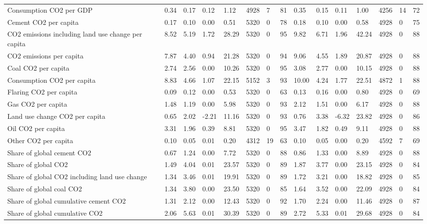 \begin{longtable}{lllllllllllllll}
\addlinespace
Consumption CO2 per GDP & 0.34 & 0.17 & 0.12 & 1.12 & 4928 & 7 & 81 & 0.35 & 0.15 & 0.11 & 1.00 & 4256 & 14 & 72\\
Cement CO2 per capita & 0.17 & 0.10 & 0.00 & 0.51 & 5320 & 0 & 78 & 0.18 & 0.10 & 0.00 & 0.58 & 4928 & 0 & 75\\
CO2 emissions including land use change per capita & 8.52 & 5.19 & 1.72 & 28.29 & 5320 & 0 & 95 & 9.82 & 6.71 & 1.96 & 42.24 & 4928 & 0 & 88\\
CO2 emissions per capita & 7.87 & 4.40 & 0.94 & 21.28 & 5320 & 0 & 94 & 9.06 & 4.55 & 1.89 & 20.87 & 4928 & 0 & 88\\
Coal CO2 per capita & 2.74 & 2.56 & 0.00 & 10.26 & 5320 & 0 & 95 & 3.08 & 2.77 & 0.00 & 10.15 & 4928 & 0 & 88\\
\addlinespace
Consumption CO2 per capita & 8.83 & 4.66 & 1.07 & 22.15 & 5152 & 3 & 93 & 10.00 & 4.24 & 1.77 & 22.51 & 4872 & 1 & 88\\
Flaring CO2 per capita & 0.09 & 0.12 & 0.00 & 0.53 & 5320 & 0 & 63 & 0.13 & 0.16 & 0.00 & 0.80 & 4928 & 0 & 69\\
Gas CO2 per capita & 1.48 & 1.19 & 0.00 & 5.98 & 5320 & 0 & 93 & 2.12 & 1.51 & 0.00 & 6.17 & 4928 & 0 & 88\\
Land use change CO2 per capita & 0.65 & 2.02 & -2.21 & 11.16 & 5320 & 0 & 93 & 0.76 & 3.38 & -6.32 & 23.82 & 4928 & 0 & 86\\
Oil CO2 per capita & 3.31 & 1.96 & 0.39 & 8.81 & 5320 & 0 & 95 & 3.47 & 1.82 & 0.49 & 9.11 & 4928 & 0 & 88\\
\addlinespace
Other CO2 per capita & 0.10 & 0.05 & 0.01 & 0.20 & 4312 & 19 & 63 & 0.10 & 0.05 & 0.00 & 0.20 & 4592 & 7 & 69\\
Share of global cement CO2 & 0.67 & 1.24 & 0.00 & 7.72 & 5320 & 0 & 88 & 0.86 & 1.33 & 0.00 & 8.89 & 4928 & 0 & 88\\
Share of global CO2 & 1.49 & 4.04 & 0.01 & 23.57 & 5320 & 0 & 89 & 1.87 & 3.77 & 0.00 & 23.15 & 4928 & 0 & 84\\
Share of global CO2 including land use change & 1.34 & 3.46 & 0.01 & 19.91 & 5320 & 0 & 89 & 1.72 & 3.21 & 0.00 & 18.82 & 4928 & 0 & 85\\
Share of global coal CO2 & 1.34 & 3.80 & 0.00 & 23.50 & 5320 & 0 & 85 & 1.64 & 3.52 & 0.00 & 22.09 & 4928 & 0 & 84\\
\addlinespace
Share of global cumulative cement CO2 & 1.31 & 2.12 & 0.00 & 12.43 & 5320 & 0 & 92 & 1.70 & 2.24 & 0.00 & 11.46 & 4928 & 0 & 87\\
Share of global cumulative CO2 & 2.06 & 5.63 & 0.01 & 30.39 & 5320 & 0 & 89 & 2.72 & 5.33 & 0.01 & 29.68 & 4928 & 0 & 84\\

\end{longtable}
